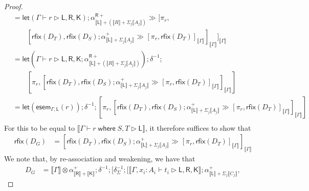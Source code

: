 \documentclass[acmsmall,screen,review]{acmart}
\newcommand{\ms}[1]{\ensuremath{\mathsf{#1}}}
\newcommand{\where}[2]{#1\;\ms{where}\;#2}
\newcommand{\bhyp}[2]{#1 : #2}
\newcommand{\haslb}[3]{#1 \vdash #2 \rhd #3}
\newcommand{\dnt}[1]{\llbracket{#1}\rrbracket}
\newcommand{\entrymor}[3]{\ms{esem}_{#1, #3}(#2)}
\newcommand{\lmor}[1]{\ms{let}(#1)}
\newcommand{\rfix}[1]{\ms{rfix}(#1)}
\newcommand{\rseq}[3]{#2 \gg_{#1} #3}
\newcommand{\envcop}[3]{[#2, #3]_{#1}}
\begin{document}
\begin{proof}
\begin{equation}
\begin{aligned}
      & = \lmor{\haslb{\Gamma}{r}{\ms{L}, \ms{R}, \ms{K}}}
        ; \rseq{}
          {\alpha^{\ms{R}+}_{\dnt{\ms{L}} + (\dnt{R} + \Sigma_j\dnt{A_j})}}{
            \envcop{\dnt{\Gamma}}{\pi_r}{ \\ & \qquad
              \envcop{\dnt{\Gamma}}{
                \rfix{D_T}
              }{
                \rseq{}
                  {\rfix{D_S} ; \alpha^+_{\dnt{\ms{L}} + \Sigma_j\dnt{A_j}}}
                  {\envcop{\dnt{\Gamma}}{\pi_r}{\rfix{D_T}}}
              }
            }
          } \\
      & = \lmor{
          \haslb{\Gamma}{r}{\ms{L}, \ms{R}, \ms{K}} 
          ; \alpha^{\ms{R}+}_{\dnt{\ms{L}} + (\dnt{R} + \Sigma_j\dnt{A_j})}}
        ; \delta^{-1}
        ; \\ & \qquad [\pi_r, 
            \envcop{\dnt{\Gamma}}{
              \rfix{D_T}
            }{
              \rseq{}
                {\rfix{D_S} ; \alpha^+_{\dnt{\ms{L}} + \Sigma_j\dnt{A_j}}}
                {\envcop{\dnt{\Gamma}}{\pi_r}{\rfix{D_T}}}
            }
        ] \\
        & = \lmor{\entrymor{\Gamma}{r}{\ms{L}}}
        ; \delta^{-1}
        ; [\pi_r, 
            \envcop{\dnt{\Gamma}}{
              \rfix{D_T}
            }{
              \rseq{}
                {\rfix{D_S} ; \alpha^+_{\dnt{\ms{L}} + \Sigma_j\dnt{A_j}}}
                {\envcop{\dnt{\Gamma}}{\pi_r}{\rfix{D_T}}}
            }
        ] \\
    \end{aligned}
  \end{equation}
  For this to be equal to $\dnt{\haslb{\Gamma}{\where{r}{S, T}}{\ms{L}}}$, it therefore suffices to
  show that
  \begin{equation}
    \begin{aligned}
      \rfix{D_G} &= \envcop{\dnt{\Gamma}}{
        \rfix{D_T}
      }{
        \rseq{}
          {\rfix{D_S} ; \alpha^+_{\dnt{\ms{L}} + \Sigma_j\dnt{A_j}}}
          {\envcop{\dnt{\Gamma}}{\pi_r}{\rfix{D_T}}}
      }
    \end{aligned}
    \label{eqn:dgdt}
  \end{equation}
  We note that, by re-association and weakening, we have that
  \begin{equation}
    \begin{aligned}
      D_G 
      & = \dnt{\Gamma} \otimes \alpha^+_{\dnt{\ms{R}} + \dnt{\ms{K}}} ; \delta^{-1} ; [
        \delta^{-1}_\Sigma ; [
          \dnt{\haslb{\Gamma, \bhyp{x_i}{A_i}}{t_i}{\ms{L}, \ms{R}, \ms{K}}}
          ; \alpha^+_{\dnt{\ms{L}} + \Sigma_j\dnt{C_j}},

\end{aligned}
\end{equation}
\end{proof}
\end{document}
